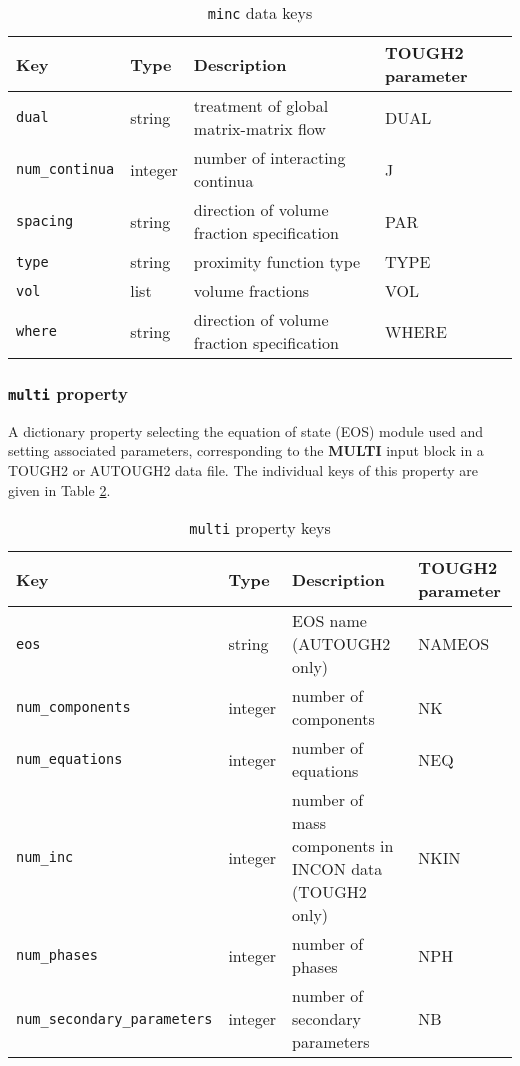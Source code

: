 \begin{table}
  \begin{center}
    \begin{tabular}{|l|l|l|l|}
      \hline
      \textbf{Key} & \textbf{Type} & \textbf{Description} & \textbf{TOUGH2 parameter}\\
      \hline
      \texttt{dual} & string & treatment of global matrix-matrix flow & DUAL\\
      \texttt{num\_continua} & integer & number of interacting continua & J\\
      \texttt{spacing} & string & direction of volume fraction specification & PAR\\
      \texttt{type} & string & proximity function type & TYPE\\
      \texttt{vol} & list & volume fractions & VOL\\
      \texttt{where} & string & direction of volume fraction specification & WHERE\\
      \hline
    \end{tabular}
    \caption{\texttt{minc} data keys}
    \label{tb:minc}
  \end{center}
\end{table}

\subsubsection{\texttt{multi} property}

A dictionary property selecting the equation of state (EOS) module used and setting associated parameters, corresponding to the \textbf{MULTI} input block in a TOUGH2 or AUTOUGH2 data file.  The individual keys of this property are given in Table \ref{tb:multi}.

\begin{table}
  \begin{center}
    \begin{tabular}{|l|l|p{37mm}|p{23mm}|}
      \hline
      \textbf{Key} & \textbf{Type} & \textbf{Description} & \textbf{TOUGH2 parameter}\\
      \hline
      \texttt{eos} & string & EOS name (AUTOUGH2 only) & NAMEOS\\
      \texttt{num\_components} & integer & number of components & NK\\
      \texttt{num\_equations} & integer & number of equations & NEQ\\
      \texttt{num\_inc} & integer & number of mass components in INCON data (TOUGH2 only) & NKIN\\
      \texttt{num\_phases} & integer & number of phases & NPH\\
      \texttt{num\_secondary\_parameters} & integer & number of secondary parameters & NB\\
      \hline
    \end{tabular}
    \caption{\texttt{multi} property keys}
    \label{tb:multi}
  \end{center}
\end{table}

